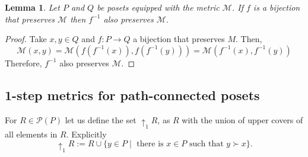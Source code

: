 \documentclass{article}[12pt]
\theoremstyle{exampstyle}
\newtheorem{lemma}[theorem]{Lemma}
\theoremstyle{remark}
\newcommand{\N}{\mathbb{N}}
\renewcommand{\P}{\mathcal{P}}
\begin{document}
\begin{lemma}
 Let $P$ and $Q$ be posets equipped with the metric $\mathcal{M}$. If $f$ is a bijection that preserves $\mathcal{M}$ then $f^{-1}$ also preserves $\mathcal{M}$.  
 \label{lemma_f-1_preserves}
\end{lemma}
\begin{proof}
Take $x,y \in Q$ and $f: P \to Q$ a bijection that preserves $M$. Then,
    \begin{equation*}
        \mathcal{M}(x,y) = \mathcal{M}(f(f^{-1}(x)), f(f^{-1}(y))) = \mathcal{M}(f^{-1}(x), f^{-1}(y))
    \end{equation*} 
Therefore, $f^{-1}$ also preserves $\mathcal{M}$.
\end{proof}


 









\subsection{1-step metrics for path-connected posets}



For $R \in \P(P)$ let us define the set $\uparrow_1 R$, as $R$ with the union of upper covers of all elements in $R$. Explicitly \[\uparrow_1 R := R \cup \{ y \in P \mid \text{ there is } x \in P \text{ such that } y \succ x \}. \]
\end{document}
